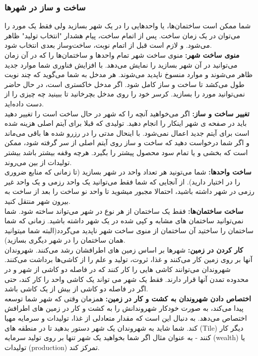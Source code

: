 \documentclass[]{article}
\begin{document}
\subsubsection*{{\titr ساخت و ساز در شهرها}}
شما ممکن است ساختمان‌ها، یا واحدهایی را در یک شهر بسازید ولی فقط یک مورد را می‌توان در یک زمان ساخت. پس از اتمام ساخت، پیام هشدار "انتخاب تولید" ظاهر می‌شود. و لازم است قبل از اتمام نوبت، ساخت‌وساز بعدی انتخاب شود.
\\\noindent \textbf{منوی ساخت شهر:}
منوی ساخت شهر تمام واحدها و ساختمان‌ها را که در آن زمان می‌توانید در آن شهر بسازید را نمایش می‌دهد. با افزایش فناوری شما موارد جدید ظاهر می‌شوند و موارد منسوخ ناپدید می‌شوند. هر مدخل به شما می‌گوید که چند نوبت طول می‌کشد تا ساخت و ساز کامل شود. اگر مدخل خاکستری است، در حال حاضر نمی‌توانید مورد را بسازید. کرسر خود را روی مدخل بچرخانید تا ببینید چه چیزی را از دست داده‌اید.
\\\noindent \textbf{تغییر ساخت و ساز:}
اگر می‌خواهید آنچه را که شهر در حال ساخت است را تغییر دهید باید در صفحه ی شهر اینکار را انجام دهید. تولیدی که قبلا برای آیتم اصلی هزینه شده است برای آیتم جدید اعمال نمی‌شود. با اینحال مدتی را در رزرو شده ها باقی می‌ماند و اگر شما درخواست دهید که ساخت و ساز روی آیتم اصلی از سر گرفته شود، ممکن است که بخشی و یا تمام سود محصول پیشتر را بگیرد. هرچه وقفه بیشتر باشد بیشتر تولیدات از بین می‌روند.
\\\noindent \textbf{ساخت واحدها:}
شما می‌تونید هر تعداد واحد در شهر بسازید (تا زمانی که منابع ضروری را در اختیار دارید). از آنجایی که شما فقط می‌توانید یک واحد رزمی و یک واحد غیر رزمی در شهر داشته باشید، احتمالا مجبور میشوید تا واحد نو ساخت را بعد از ساخت به بیرون شهر منتقل کنید.
\\\noindent \textbf{ساخت ساختمان‌ها:}
فقط یک ساختمان از هر نوع در شهر می‌تواند ساخته شود. شما نمی‌توانید ساختمان های مشابه و کپی شده در یک شهر داشته باشید. زمانی که شما ساختمان را ساختید آن ساختمان از منوی ساخت شهر ناپدید می‌گردد(البته شما میتوانید همان ساختمان را در شهر دیگری بسازید).
\\\noindent \textbf{کار کردن در زمین:}
شهرها بر اساس زمین های اطرافشان رشد می‌کنند. شهروندان آنها بر روی زمین کار می‌کنند و غذا، ثروت، تولید و علم را از کاشی‌ها برداشت می‌کنند. شهروندان می‌توانند کاشی هایی را کار کنند که در فاصله دو کاشی از شهر و در محدوده تمدن آنها قرار دارند. فقط یک شهر می تواند یک کاشی واحد را کار کند، حتی اگر در فاصله دو کاشی از بیش از یک کاشی باشد.
\\\noindent \textbf{اختصاص دادن شهروندان به کشت و کار در زمین:}
همزمان وقتی که شهر شما توسعه پیدا می‌­کند، به صورت خودکار شهروندانش را به کشت و کار در زمین های اطرافش اختصاص می­‌دهد. به دنبال این است که مقدار متعادلی از غذا، تولیدات و سرمایه مهیا کند. شما شاید به شهروندان یک شهر دستور بدهید تا در منطقه های (Tile) دیگر کار کنند - به عنوان مثال اگر شما بخواهید یک شهر تنها بر روی تولید سرمایه (wealth) یا تولیدات (production) تمرکز کند. 
\end{document}
